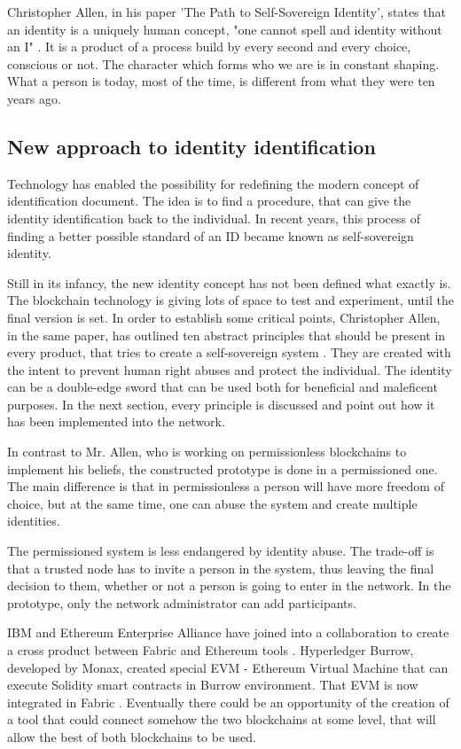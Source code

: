\documentclass[a4paper,11pt]{report}
\begin{document}
Christopher Allen, in his paper 'The Path to Self-Sovereign Identity', states that an identity is a uniquely human concept, "one cannot spell and identity without an I" \cite{allen2016path}. It is a product of a process build by every second and every choice, conscious or not. The character which forms who we are is in constant shaping. What a person is today, most of the time, is different from what they were ten years ago. 

\subsection{New approach to identity identification}

Technology has enabled the possibility for redefining the modern concept of identification document. The idea is to find a procedure, that can give the identity identification back to the individual. In recent years, this process of finding a better possible standard of an ID became known as self-sovereign identity. 

Still in its infancy, the new identity concept has not been defined what exactly is. The blockchain technology is giving lots of space to test and experiment, until the final version is set. In order to establish some critical points, Christopher Allen, in the same paper, has outlined ten abstract principles that should be present in every product, that tries to create a self-sovereign system \cite{allen2016path}. They are created with the intent to prevent human right abuses and protect the individual. The identity can be a double-edge sword that can be used both for beneficial and maleficent purposes. In the next section, every principle is discussed and point out how it has been implemented into the network.  

In contrast to Mr. Allen, who is working on permissionless blockchains to implement his beliefs, the constructed prototype is done in a permissioned one. The main difference is that in permissionless a person will have more freedom of choice, but at the same time, one can abuse the system and create multiple identities. 

The permissioned system is less endangered by identity abuse. The trade-off is that a trusted node has to invite a person in the system, thus leaving the final decision to them, whether or not a person is going to enter in the network. In the prototype, only the network administrator can add participants.

IBM and Ethereum Enterprise Alliance have joined into a collaboration to create a cross product between Fabric and Ethereum tools \cite{joinforces}. Hyperledger Burrow, developed by Monax, created special EVM - Ethereum Virtual Machine that can execute Solidity smart contracts in Burrow environment. That EVM is now integrated in Fabric \cite{evmInFabric}. Eventually there could be an opportunity of the creation of a tool that could connect somehow the two blockchains at some level, that will allow the best of both blockchains to be used.
\end{document}
